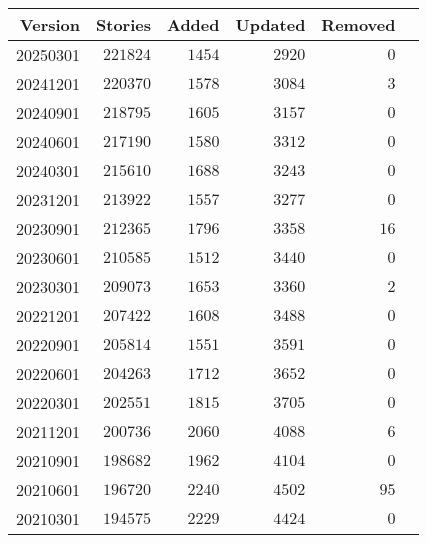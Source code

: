 \documentclass[hidelinks,a4paper,12pt]{article}
\begin{document}
\begin{center}
\begin{tabular}{|r|r|r|r|r|r|} \hline
\textbf{Version} & \textbf{Stories} & \textbf{Added} & \textbf{Updated} & \textbf{Removed} \\ \hline
20250301         & $221824$         & $1454$         & $2920$           & $0$              \\ \hline
20241201         & $220370$         & $1578$         & $3084$           & $3$              \\ \hline
20240901         & $218795$         & $1605$         & $3157$           & $0$              \\ \hline
20240601         & $217190$         & $1580$         & $3312$           & $0$              \\ \hline
20240301         & $215610$         & $1688$         & $3243$           & $0$              \\ \hline
20231201         & $213922$         & $1557$         & $3277$           & $0$              \\ \hline
20230901         & $212365$         & $1796$         & $3358$           & $16$             \\ \hline
20230601         & $210585$         & $1512$         & $3440$           & $0$              \\ \hline
20230301         & $209073$         & $1653$         & $3360$           & $2$              \\ \hline
20221201         & $207422$         & $1608$         & $3488$           & $0$              \\ \hline
20220901         & $205814$         & $1551$         & $3591$           & $0$              \\ \hline
20220601         & $204263$         & $1712$         & $3652$           & $0$              \\ \hline
20220301         & $202551$         & $1815$         & $3705$           & $0$              \\ \hline
20211201         & $200736$         & $2060$         & $4088$           & $6$              \\ \hline
20210901         & $198682$         & $1962$         & $4104$           & $0$              \\ \hline
20210601         & $196720$         & $2240$         & $4502$           & $95$             \\ \hline
20210301         & $194575$         & $2229$         & $4424$           & $0$              \\ \hline

\end{tabular}
\end{center}
\end{document}
